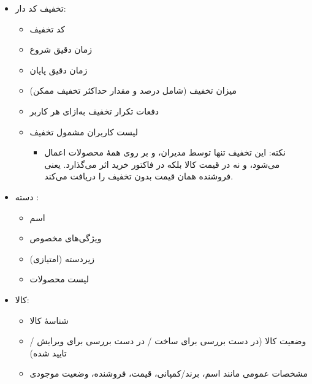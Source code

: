 \documentclass[]{article}
\begin{document}
\begin{itemize}
\item
تخفیف کد دار:

\begin{itemize}
\item
کد تخفیف

\item
زمان دقیق شروع

\item
زمان دقیق پایان

\item
میزان تخفیف (شامل درصد و مقدار حداکثر تخفیف ممکن)

\item
دفعات تکرار تخفیف به‌ازای هر کاربر

\item
لیست کاربران مشمول تخفیف


\begin{itemize}[label = {$\blacksquare$}]
\item
نکته:‌ این تخفیف تنها توسط مدیران، و بر روی همهٔ محصولات اعمال می‌شود، و نه در قیمت کالا بلکه در فاکتور خرید اثر می‌گذارد. یعنی فروشنده همان قیمت بدون تخفیف را دریافت می‌کند.
\end{itemize}

\end{itemize}


\newpage

\item
دسته :

\begin{itemize}
\item
اسم

\item
ویژگی‌های مخصوص

\item
زیردسته (امتیازی)

\item
لیست محصولات

\vspace{1cm}


\end{itemize}
\item
کالا:

\begin{itemize}

\item
شناسهٔ کالا 

\item
وضعیت کالا (در دست بررسی برای ساخت / در دست بررسی برای ویرایش / تایید شده)

\item
مشخصات عمومی مانند اسم، برند/کمپانی، قیمت، فروشنده، وضعیت موجودی


\end{itemize}
\end{itemize}
\end{document}
